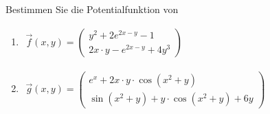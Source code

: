 Bestimmen Sie die Potentialfunktion von
\begin{enumerate}
\item
$\begin{aligned}
\vec{f}(x,y) 
= \begin{pmatrix}
	y^2 + 2e^{2x - y} - 1 \\[2mm]
	2x \cdot y - e^{2x - y} + 4y^3
\end{pmatrix}
\end{aligned}$
%
\item
$\begin{aligned}
\vec{g}(x,y) 
= \begin{pmatrix}
	e^x + 2x \cdot y \cdot \cos(x^2 + y) \\[2mm]
    \sin(x^2 + y) + y \cdot \cos(x^2 + y) + 6y
\end{pmatrix}
\end{aligned}$
\end{enumerate}